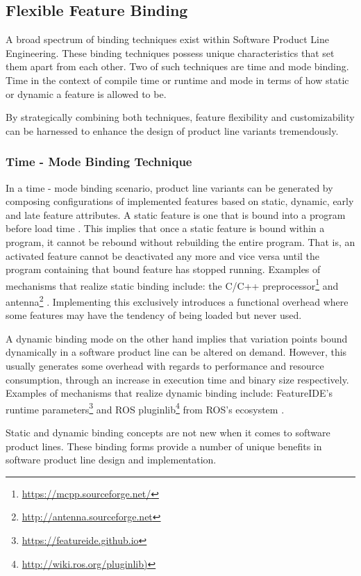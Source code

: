 \documentclass[conference]{IEEEtran}
\newcommand{\foot}[1]{\footnote{\url{#1}}}
\begin{document}
\subsection{Flexible Feature Binding}
A broad spectrum of binding techniques exist within Software Product Line Engineering. These binding techniques possess unique characteristics that set them apart from each other. Two of such techniques are time and mode binding. Time in the context of compile time or runtime and mode in terms of how static or dynamic a feature is allowed to be. 

By strategically combining both techniques, feature flexibility and customizability can be harnessed to enhance the design of product line variants tremendously.

\subsubsection{Time - Mode Binding Technique}
In a time - mode binding scenario, product line variants can be generated by composing configurations of implemented features based on static, dynamic, early and late feature attributes. A static feature is one that is bound into a program before load time \cite{flex-feat-bind}. This implies that once a static feature is bound within a program, it cannot be rebound without rebuilding the entire program. That is, an activated feature cannot be deactivated any more and vice versa until the program containing that bound feature has stopped running. Examples of mechanisms that realize static binding include: the C/C++ preprocessor\foot{https://mcpp.sourceforge.net/} and antenna\foot{http://antenna.sourceforge.net} \cite{flex-feat-bind}. Implementing this exclusively introduces a functional overhead where some features may have the tendency of being loaded but never used.

A dynamic binding mode on the other hand implies that variation points bound dynamically in a software product line can be altered on demand. However, this usually generates some overhead with regards to performance and resource consumption, through an increase in execution time and binary size respectively. Examples of mechanisms that realize dynamic binding include: FeatureIDE's runtime parameters\foot{https://featureide.github.io} and ROS pluginlib\foot{http://wiki.ros.org/pluginlib)} from ROS's ecosystem \cite{flex-feat-bind}.

Static and dynamic binding concepts are not new when it comes to software product lines. These binding forms provide a number of unique benefits in software product line design and implementation. 
\end{document}
